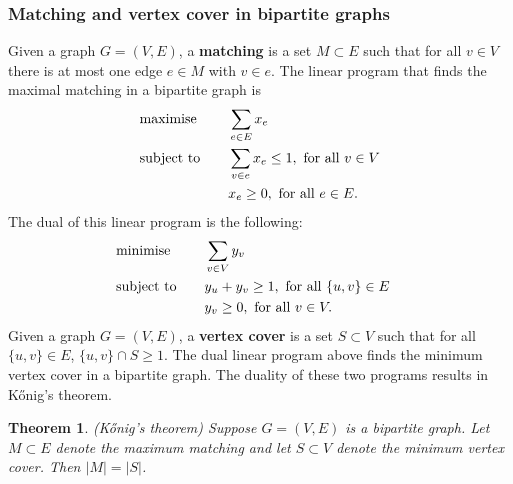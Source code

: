 \documentclass[12pt]{article}
\theoremstyle{plain}
\newtheorem*{theorem*}{Theorem}
\begin{document}
\subsubsection{Matching and vertex cover in bipartite graphs}
Given a graph $G=(V,E)$, a \textbf{matching} is a set $M\subset E$ such that for all $v\in V$ there is at most one edge $e\in M$ with $v\in e$. The linear program that finds the maximal matching in a bipartite graph is
\begin{alignat*}{2}
    & \textup{maximise} & \quad & \sum_{e\in E} x_e \\
    & \textup{subject to} & & \sum_{v\in e}x_e \leq 1,\ \text{for all}\ v\in V\\
    &                     & & x_e \geq 0,\ \text{for all}\ e\in E.
\end{alignat*}
The dual of this linear program is the following:
\begin{alignat*}{3}
    & \textup{minimise} & \quad & \sum_{v\in V} y_v &\\
    & \textup{subject to} & & y_u + y_v \geq 1,\  \text{for all}\ \{u,v\}\in E\\
    &                     & & y_v \geq 0, \  \text{for all}\ v\in V.
\end{alignat*}
    Given a graph $G=(V,E)$, a \textbf{vertex cover} is a set $S \subset V$ such that for all $\{u, v\}\in E$, $\{u,v\}\cap S\geq 1$. The dual linear program above finds the minimum vertex cover in a bipartite graph. The duality of these two programs results in K\H{o}nig's theorem.
\begin{theorem*}{\textup{(K\H{o}nig's theorem)}}
    Suppose $G=(V,E)$ is a bipartite graph. Let $M\subset E$ denote the maximum matching and let $S\subset V$ denote the minimum vertex cover. Then $|M|=|S|$.
\end{theorem*}
\end{document}
